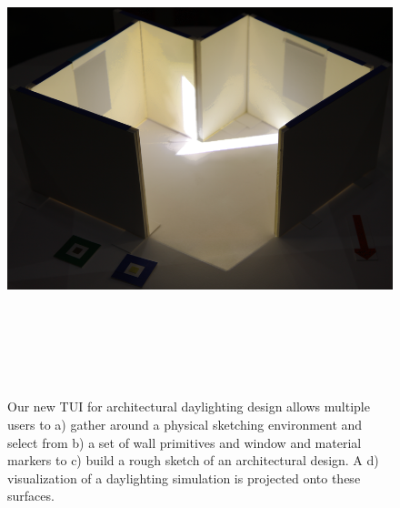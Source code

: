 \begin{figure}[t]
\begin{center}
  \includegraphics[width=\figwidth]{sample_rendering}\vspace{-0.19in}\\
\begin{minipage}{\figwidth}~{\color{black}{\bf c)}}\end{minipage}
\begin{minipage}{\figwidth}~{\color{white}{\bf d)}}\end{minipage}\vspace{-0.15in}\\
\end{center}
  \caption{Our new TUI for architectural daylighting design allows
    multiple users to a) gather around a physical sketching
    environment and select from b) a set of wall primitives and window
    and material markers to c) build a rough sketch of an
    architectural design.  A d) visualization of a daylighting
    simulation is projected onto these surfaces. 
	\label{figure:tabletop}
	}
  
\end{figure}
